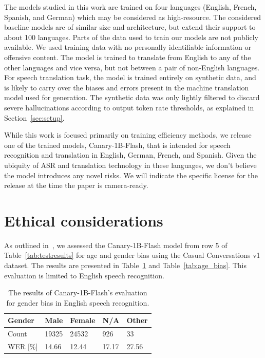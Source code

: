 \documentclass[11pt]{article}
\begin{document}
The models studied in this work are trained on four languages (English, French, Spanish, and German) which may be considered as high-resource. 
The considered baseline models are of similar size and architecture, but extend their support to about 100 languages. 
Parts of the data used to train our models are not publicly available.
We used training data with no personally identifiable information or offensive content.
The model is trained to translate from English to any of the other languages and vice versa, but not between a pair of non-English languages.
For speech translation task, the model is trained entirely on synthetic data, and is likely to carry over the biases and errors present in the machine translation model used for generation.
The synthetic data was only lightly filtered to discard severe hallucinations according to output token rate thresholds, as explained in Section~\ref{sec:setup}.

While this work is focused primarily on training efficiency methods, we release one of the trained models, Canary-1B-Flash, that is intended for speech recognition and translation in English, German, French, and Spanish.
Given the ubiquity of ASR and translation technology in these languages, we don't believe the model introduces any novel risks.
We will indicate the specific license for the release at the time the paper is camera-ready.

\section*{Ethical considerations}

As outlined in~\citet{hazirbas2021towards}, we assessed the Canary-1B-Flash model from row 5 of Table~\ref{tab:testresults} for age and gender bias using the Casual Conversations v1 dataset. 
The results are presented in Table~\ref{tab:gender_bias} and Table~\ref{tab:age_bias}. 
This evaluation is limited to English speech recognition.

\begin{table}
    \centering
    \begin{tabular}{|l|l|l|l|l|}
        \hline
        Gender & Male & Female & N/A & Other \\
        \hline
        Count & 19325 & 24532 & 926 & 33 \\
        WER [\%] & 14.66 & 12.44 & 17.17 & 27.56 \\
        \hline
    \end{tabular}
    \caption{The results of Canary-1B-Flash's evaluation for gender bias in English speech recognition.}
    \label{tab:gender_bias}
\end{table}
\end{document}
